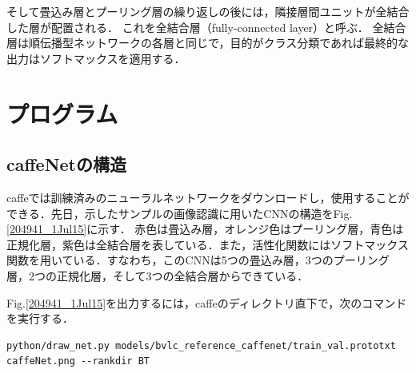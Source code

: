 \documentclass[a4paper,10pt]{jsarticle}
\begin{document}
そして畳込み層とプーリング層の繰り返しの後には，隣接層間ユニットが全結合した層が配置される．
これを全結合層（fully-connected layer）と呼ぶ．
全結合層は順伝播型ネットワークの各層と同じで，目的がクラス分類であれば最終的な出力はソフトマックスを適用する．


\section{プログラム}
\subsection{caffeNetの構造}
caffeでは訓練済みのニューラルネットワークをダウンロードし，使用することができる．先日，示したサンプルの画像認識に用いたCNNの構造をFig.\ref{204941_1Jul15}に示す．
赤色は畳込み層，オレンジ色はプーリング層，青色は正規化層，紫色は全結合層を表している．また，活性化関数にはソフトマックス関数を用いている．すなわち，このCNNは5つの畳込み層，3つのプーリング層，2つの正規化層，そして3つの全結合層からできている．

Fig.\ref{204941_1Jul15}を出力するには，caffeのディレクトリ直下で，次のコマンドを実行する．
\begin{lstlisting}[basicstyle=\ttfamily\footnotesize, frame=single,breaklines = true]
python/draw_net.py models/bvlc_reference_caffenet/train_val.prototxt caffeNet.png --rankdir BT
\end{lstlisting}
\end{document}
